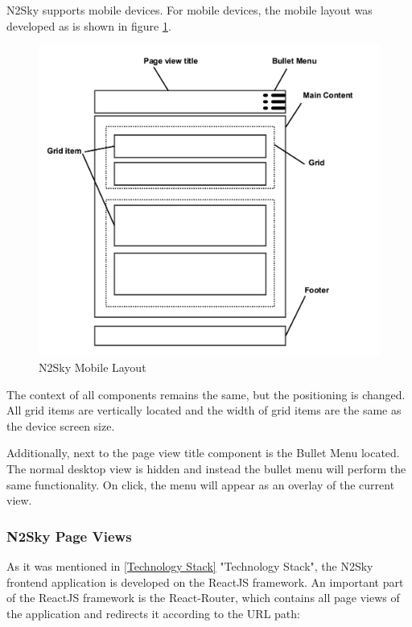 N2Sky supports mobile devices. For mobile devices, the mobile layout was developed as is shown in figure \ref{fig:layout_mobile}.

\begin{figure}[H]
\begin{center}
  \includegraphics[width=\linewidth]{components/3/components/layout_mobile.png}
  \caption{N2Sky Mobile Layout}
  \label{fig:layout_mobile}
\end{center}
\end{figure}

The context of all components remains the same, but the positioning is changed. All grid items are vertically located and the width of grid items are the same as the device screen size. 

Additionally, next to the page view title component is the Bullet Menu located. The normal desktop view is hidden and instead the bullet menu will perform the same functionality. On click, the menu will appear as an overlay of the current view. 

\subsubsection{N2Sky Page Views}\label{N2Sky Page Views}

As it was mentioned in \autoref{Technology Stack} "Technology Stack", the N2Sky frontend application is developed on the ReactJS framework. An important part of the ReactJS framework is the React-Router, which contains all page views of the application and redirects it according to the URL path:

